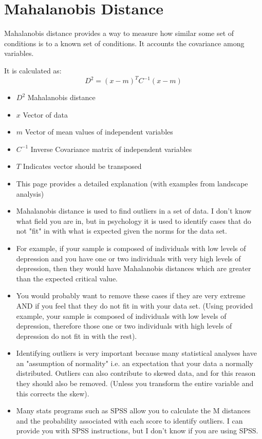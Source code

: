 \documentclass[11pt]{article} %
\begin{document}
\section*{Mahalanobis Distance}


Mahalanobis distance provides a way to measure how similar some set of conditions is to a known set of conditions. It accounts the covariance among variables.

It is calculated as:
\[D^2=(x-m)^TC^{-1}(x-m)\]
\begin{itemize}
\item $D^2$ Mahalanobis distance
\item $x$ Vector of data
\item $m$ Vector of mean values of independent variables
\item $C^{-1}$ Inverse Covariance matrix of independent variables
\item $T$ Indicates vector should be transposed
\end{itemize}

\begin{itemize}

\item This page provides a detailed explanation (with examples from landscape analysis)


\item Mahalanobis distance is used to find outliers in a set of data. I don't know what field you are in, but in psychology it is used to identify cases that do not "fit" in with what is expected given the norms for the data set. 

\item For example, if your sample is composed of individuals with low levels of depression and you have one or two individuals with very high levels of depression, then they would have Mahalanobis distances which are greater than the expected critical value. 

\item You would probably want to remove these cases if they are very extreme AND if you feel that they do not fit in with your data set. (Using provided example, your sample is composed of individuals with low levels of depression, therefore those one or two individuals with high levels of depression do not fit in with the rest). 

\item Identifying outliers is very important because many statistical analyses have an "assumption of normality" i.e. an expectation that your data a normally distributed. Outliers can also contribute to skewed data, and for this reason they should also be removed. (Unless you transform the entire variable and this corrects the skew). 

\item Many stats programs such as SPSS allow you to calculate the M distances and the probability associated with each score to identify outliers. I can provide you with SPSS instructions, but I don't know if you are using SPSS.
\end{itemize}
\end{document}
